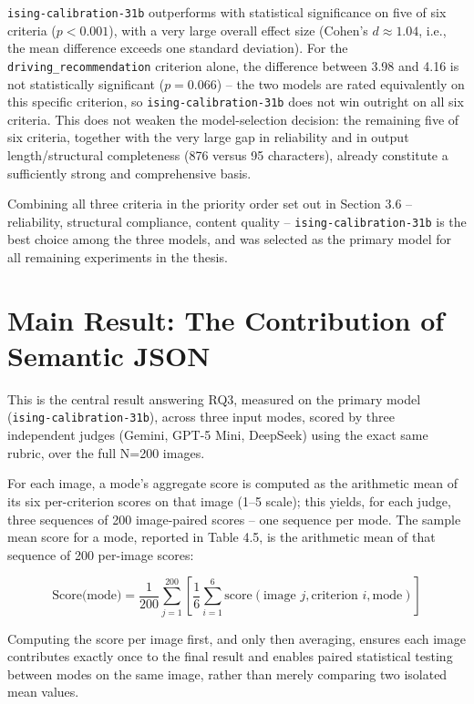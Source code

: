 \documentclass[12pt,a4paper]{report}
\begin{document}
\texttt{ising-calibration-31b} outperforms with statistical significance on five of six criteria ($p<0.001$), with a very large overall effect size (Cohen's $d \approx 1.04$, i.e., the mean difference exceeds one standard deviation). For the \texttt{driving\_recommendation} criterion alone, the difference between 3.98 and 4.16 is not statistically significant ($p=0.066$) -- the two models are rated equivalently on this specific criterion, so \texttt{ising-calibration-31b} does not win outright on all six criteria. This does not weaken the model-selection decision: the remaining five of six criteria, together with the very large gap in reliability and in output length/structural completeness (876 versus 95 characters), already constitute a sufficiently strong and comprehensive basis.

Combining all three criteria in the priority order set out in Section 3.6 -- reliability, structural compliance, content quality -- \texttt{ising-calibration-31b} is the best choice among the three models, and was selected as the primary model for all remaining experiments in the thesis.

\section{Main Result: The Contribution of Semantic JSON}

This is the central result answering RQ3, measured on the primary model (\texttt{ising-calibration-31b}), across three input modes, scored by three independent judges (Gemini, GPT-5 Mini, DeepSeek) using the exact same rubric, over the full N=200 images.

For each image, a mode's aggregate score is computed as the arithmetic mean of its six per-criterion scores on that image (1--5 scale); this yields, for each judge, three sequences of 200 image-paired scores -- one sequence per mode. The sample mean score for a mode, reported in Table 4.5, is the arithmetic mean of that sequence of 200 per-image scores:

\[
\text{Score(mode)} = \frac{1}{200} \sum_{j=1}^{200} \left[ \frac{1}{6} \sum_{i=1}^{6} \text{score}(\text{image } j, \text{criterion } i, \text{mode}) \right]
\]

Computing the score per image first, and only then averaging, ensures each image contributes exactly once to the final result and enables paired statistical testing between modes on the same image, rather than merely comparing two isolated mean values.
\end{document}
